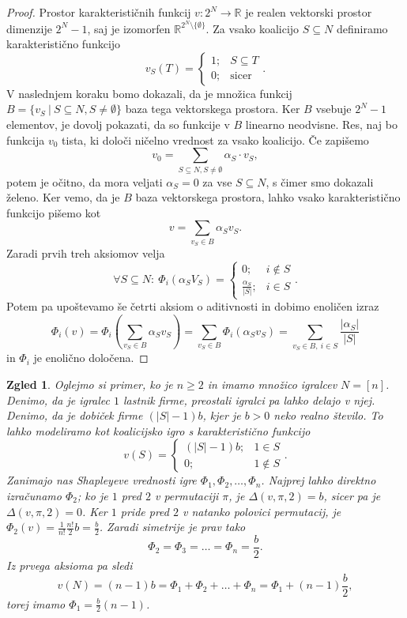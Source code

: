 \documentclass[10pt, a4paper]{article}
\newtheorem{zgled}[izr]{Zgled}
\newenvironment{noticeC}{%
  \tcolorbox[%
  notitle,
  empty,
  enhanced,  %
  breakable,
  coltext=black, 
  fontupper=\rmfamily,
  noparskip,
  sharp corners,
  boxrule=-1pt,  %
  frame hidden,
  left=7pt,  %
  right=7pt,
  top=5pt,
  bottom=5pt,
  before skip=2.5ex plus 2pt,
  after skip=2.5ex plus 2pt,
  overlay unbroken and last={%
  },
  ]}
{\endtcolorbox}
\newenvironment{dokaz}%
  {\begin{noticeC}\begin{proof}}%
  {\end{proof}\end{noticeC}}
\newcommand{\R}{\mathbb {R}}
\begin{document}
\begin{dokaz}
  Prostor karakterističnih funkcij $v: 2^N \to \R$ je realen vektorski prostor dimenzije $2^N - 1$,
  saj je izomorfen $\R^{2^N \setminus \{\emptyset\}}$.
  Za vsako koalicijo $S \subseteq N$ definiramo karakteristično funkcijo
  $$v_S (T) = \begin{cases}
    1;& S \subseteq T\\
    0;& \text{sicer}
  \end{cases}.$$
  V naslednjem koraku bomo dokazali, da je množica funkcij 
  $B = \{v_S\ |\ S \subseteq N, S \neq \emptyset\}$ baza tega vektorskega prostora.
  Ker $B$ vsebuje $2^N - 1$ elementov, je dovolj pokazati, da so funkcije v $B$ linearno neodvisne.
  Res, naj bo funkcija $v_0$ tista, ki določi ničelno vrednost za vsako koalicijo.
  Če zapišemo 
  $$v_0 = \sum_{S \subseteq N, S \neq \emptyset} \alpha_S \cdot v_S,$$
  potem je očitno, da mora veljati $\alpha_S = 0$ za vse $S \subseteq N$,
  s čimer smo dokazali želeno. Ker vemo, da je $B$ baza vektorskega prostora,
  lahko vsako karakteristično funkcijo pišemo kot 
  $$v = \sum_{v_S \in B} \alpha_S v_S.$$
  Zaradi prvih treh aksiomov velja 
  $$\forall S \subseteq N:\ \Phi_i (\alpha_S V_S) = \begin{cases}
    0;& i \notin S\\
    \frac{\alpha_S}{|S|};& i \in S
  \end{cases}.$$
  Potem pa upoštevamo še četrti aksiom o aditivnosti in dobimo enoličen izraz 
  $$\Phi_i (v) = \Phi_i \left(\sum_{v_S \in B} \alpha_S v_S\right) = \sum_{v_S \in B} \Phi_i (\alpha_S v_S) = \sum_{v_S \in B,\ i \in S} \frac{|\alpha_S|}{|S|}$$
  in $\Phi_i$ je enolično določena.
\end{dokaz}

\begin{zgled}
  Oglejmo si primer, ko je $n \geq 2$ in imamo množico igralcev $N = [n]$.
  Denimo, da je igralec $1$ lastnik firme, preostali igralci pa lahko delajo v njej.
  Denimo, da je dobiček firme $(|S| - 1)b$, kjer je $b > 0$ neko realno število.
  To lahko modeliramo kot koalicijsko igro s karakteristično funkcijo 
  $$v(S) = \begin{cases}
    (|S| - 1)b;& 1 \in S\\
    0;& 1 \notin S
  \end{cases}.$$
  Zanimajo nas Shapleyeve vrednosti igre $\Phi_1, \Phi_2, \dots, \Phi_n$.
  Najprej lahko direktno izračunamo $\Phi_2$; ko je $1$ pred $2$ v permutaciji $\pi$, je $\Delta(v, \pi, 2) = b$,
  sicer pa je $\Delta(v, \pi, 2) = 0$.
  Ker $1$ pride pred $2$ v natanko polovici permutacij, je $\Phi_2 (v) = \frac{1}{n!} \frac{n!}{2} b = \frac{b}{2}$.
  Zaradi simetrije je prav tako 
  $$\Phi_2 = \Phi_3 = \dots = \Phi_n = \frac{b}{2}.$$
  Iz prvega aksioma pa sledi
  $$v(N) = (n - 1)b = \Phi_1 + \Phi_2 + \dots + \Phi_n = \Phi_1 + (n - 1)\frac{b}{2},$$
  torej imamo $\Phi_1 = \frac{b}{2} (n - 1)$.
\end{zgled}
\end{document}
